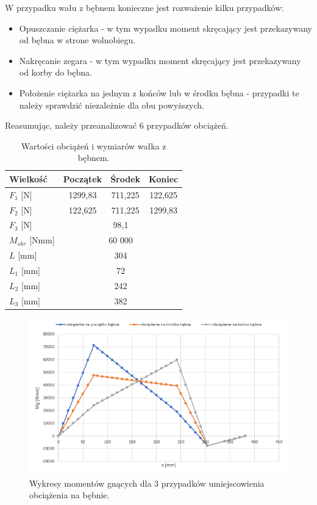         	W przypadku wału z bębnem konieczne jest rozważenie kilku przypadków:
        \begin{itemize}
        	\item Opuszczanie ciężarka - w tym wypadku moment skręcający jest przekazywany od bębna w strone wolnobiegu.
        	\item Nakręcanie zegara - w tym wypadku moment skręcający jest przekazywany od korby do bębna.
        	\item Położenie ciężarka na jednym z końców lub w środku bębna - przypadki te należy sprawdzić niezależnie dla obu powyższych.
        \end{itemize}
        
       		Reasumując, należy przeanalizować 6 przypadków obciążeń. 
       		
       		\begin{table}[h]
       			\centering
       			\begin{tabular}{l|c|c|c}
       				Wielkość & Początek & Środek & Koniec \\ \hline \hline
       				$F_1$ [N]& 1299,83 & 711,225 & 122,625 \\ 
       				$F_2$ [N]& 122,625 & 711,225 & 1299,83 \\ 
       				$F_3$ [N] & \multicolumn{3}{|c|}{98,1}\\
       				$M_{skr}$ [Nmm] &  \multicolumn{3}{|c|}{60 000} \\
       				$L$ [mm] & \multicolumn{3}{|c|}{304} \\
       				$L_1$ [mm] & \multicolumn{3}{|c|}{72}\\
       				$L_2$ [mm]  & \multicolumn{3}{|c|}{242} \\
       				$L_3$ [mm]  & \multicolumn{3}{|c|}{382} \\
       				
       				\hline
       			\end{tabular}
       			\caption{Wartości obciążeń i wymiarów wałka z bębnem.}
       			\label{tab::beben}
       		\end{table}
        	
        	\begin{figure}[th]
        		\centering
        		\includegraphics[width=0.9\linewidth]{Projekt/momenty_gnace_rozwijanie}
        		\caption{Wykresy momentów gnących dla 3 przypadków umiejscowienia obciążenia na bębnie.} 
        		\label{fig::momenty_gnace_rozwijanie}
        	\end{figure}
        
